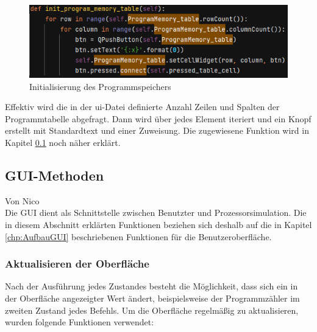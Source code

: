 \documentclass[12pt]{article}
\newcommand{\imgSpaceBefore}{\vspace{10pt}}
\begin{document}
\begin{figure}[H]
\centering
\includegraphics[width=12cm]{bilder/initProgMem}
\caption{Initialisierung des Programmspeichers}
\label{fig:InitProgMem}
\end{figure}

\noindent
Effektiv wird die in der \glqq ui\grqq-Datei definierte Anzahl Zeilen und Spalten der Programmtabelle abgefragt. Dann wird über jedes Element iteriert und ein Knopf erstellt mit Standardtext und einer Zuweisung. Die zugewiesene Funktion wird in Kapitel \ref{chapter:GUI-Methods} noch näher erklärt.


\subsection{GUI-Methoden}\label{chapter:GUI-Methods}
Von Nico\\

\noindent
Die GUI dient als Schnittstelle zwischen Benutzter und Prozessorsimulation. Die in diesem Abschnitt erklärten Funktionen beziehen sich deshalb auf die in Kapitel \ref{chp:AufbauGUI} beschriebenen Funktionen für die Benutzeroberfläche.

\subsubsection{Aktualisieren der Oberfläche}
Nach der Ausführung jedes Zustandes besteht die Möglichkeit, dass sich ein in der Oberfläche angezeigter Wert ändert, beispielsweise der Programmzähler im zweiten Zustand jedes Befehls. Um die Oberfläche regelmäßig zu aktualisieren, wurden folgende Funktionen verwendet:\imgSpaceBefore
\end{document}
